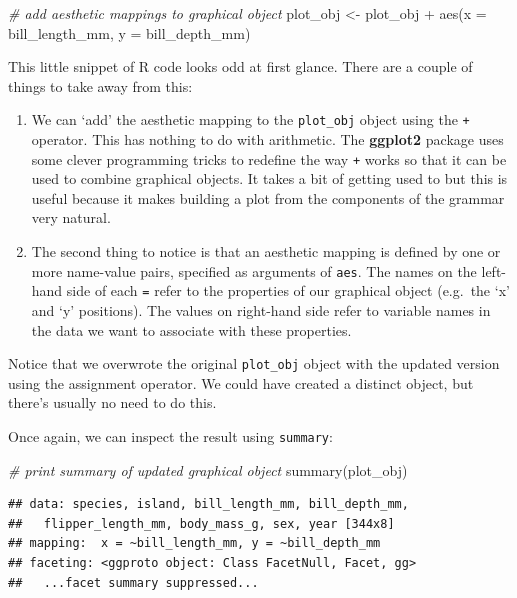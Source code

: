 \documentclass[
]{book}
\newenvironment{Shaded}{\begin{snugshade}}{\end{snugshade}}
\newcommand{\AttributeTok}[1]{\textcolor[rgb]{0.77,0.63,0.00}{#1}}
\newcommand{\CommentTok}[1]{\textcolor[rgb]{0.56,0.35,0.01}{\textit{#1}}}
\newcommand{\FunctionTok}[1]{\textcolor[rgb]{0.00,0.00,0.00}{#1}}
\newcommand{\NormalTok}[1]{#1}
\newcommand{\OtherTok}[1]{\textcolor[rgb]{0.56,0.35,0.01}{#1}}
\newcommand{\SpecialCharTok}[1]{\textcolor[rgb]{0.00,0.00,0.00}{#1}}
\providecommand{\tightlist}{%
  \setlength{\itemsep}{0pt}\setlength{\parskip}{0pt}}
\begin{document}
\begin{Shaded}
\begin{Highlighting}[]
\CommentTok{\# add aesthetic mappings to graphical object}
\NormalTok{plot\_obj }\OtherTok{\textless{}{-}}\NormalTok{ plot\_obj }\SpecialCharTok{+} \FunctionTok{aes}\NormalTok{(}\AttributeTok{x =}\NormalTok{ bill\_length\_mm, }\AttributeTok{y =}\NormalTok{ bill\_depth\_mm)}
\end{Highlighting}
\end{Shaded}

This little snippet of R code looks odd at first glance. There are a couple of things to take away from this:

\begin{enumerate}
\def\labelenumi{\arabic{enumi}.}
\tightlist
\item
  We can `add' the aesthetic mapping to the \texttt{plot\_obj} object using the \texttt{+} operator. This has nothing to do with arithmetic. The \textbf{ggplot2} package uses some clever programming tricks to redefine the way \texttt{+} works so that it can be used to combine graphical objects. It takes a bit of getting used to but this is useful because it makes building a plot from the components of the grammar very natural.
\item
  The second thing to notice is that an aesthetic mapping is defined by one or more name-value pairs, specified as arguments of \texttt{aes}. The names on the left-hand side of each \texttt{=} refer to the properties of our graphical object (e.g.~the `x' and `y' positions). The values on right-hand side refer to variable names in the data we want to associate with these properties.
\end{enumerate}

Notice that we overwrote the original \texttt{plot\_obj} object with the updated version using the assignment operator. We could have created a distinct object, but there's usually no need to do this.

Once again, we can inspect the result using \texttt{summary}:

\begin{Shaded}
\begin{Highlighting}[]
\CommentTok{\# print summary of updated graphical object}
\FunctionTok{summary}\NormalTok{(plot\_obj)}
\end{Highlighting}
\end{Shaded}

\begin{verbatim}
## data: species, island, bill_length_mm, bill_depth_mm,
##   flipper_length_mm, body_mass_g, sex, year [344x8]
## mapping:  x = ~bill_length_mm, y = ~bill_depth_mm
## faceting: <ggproto object: Class FacetNull, Facet, gg>
##   ...facet summary suppressed...
\end{verbatim}
\end{document}
